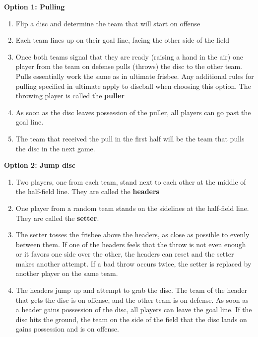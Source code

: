 \documentclass[10pt]{article}
\begin{document}
\textbf{Option 1: Pulling}
\begin{enumerate}
    \item Flip a disc and determine the team that will start on offense
    \item Each team lines up on their goal line, facing the other side of the field
    \item Once both teams signal that they are ready (raising a hand in the air) one player from the team on defense pulls (throws) the disc to the other team. Pulls essentially work the same as in ultimate frisbee. Any additional rules for pulling specified in ultimate apply to discball when choosing this option. The throwing player is called the \textbf{puller}
    \item As soon as the disc leaves possession of the puller, all players can go past the goal line.
    \item The team that received the pull in the first half will be the team that pulls the disc in the next game.
\end{enumerate}

\textbf{Option 2: Jump disc}
\begin{enumerate}
    \item Two players, one from each team, stand next to each other at the middle of the half-field line. They are called the \textbf{headers}
    \item One player from a random team stands on the sidelines at the half-field line. They are called the \textbf{setter}.
    \item The setter tosses the frisbee above the headers, as close as possible to evenly between them. If one of the headers feels that the throw is not even enough or it favors one side over the other, the headers can reset and the setter makes another attempt. If a bad throw occurs twice, the setter is replaced by another player on the same team.
    \item The headers jump up and attempt to grab the disc. The team of the header that gets the disc is on offense, and the other team is on defense. As soon as a header gains possession of the disc, all players can leave the goal line. If the disc hits the ground, the team on the side of the field that the disc lands on gains possession and is on offense.
\end{enumerate}
\end{document}

